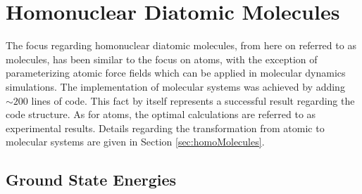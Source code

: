 \section{Homonuclear Diatomic Molecules}

The focus regarding homonuclear diatomic molecules, from here on referred to as molecules, has been similar to the focus on atoms, with the exception of parameterizing atomic force fields which can be applied in molecular dynamics simulations. The implementation of molecular systems was achieved by adding $\sim 200$ lines of code. This fact by itself represents a successful result regarding the code structure. As for atoms, the optimal calculations are referred to as experimental results. Details regarding the transformation from atomic to molecular systems are given in Section \ref{sec:homoMolecules}.

\subsection{Ground State Energies}
 
